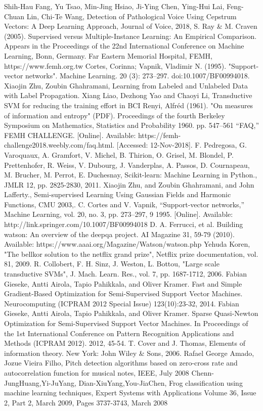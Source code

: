 \documentclass[conference]{IEEEtran}
\begin{document}
\begin{thebibliography}{00}
Shih-Hau Fang, Yu Tsao, Min-Jing Hsiao, Ji-Ying Chen, Ying-Hui Lai, Feng-Chuan Lin, Chi-Te Wang,
Detection of Pathological Voice Using Cepstrum Vectors: A Deep Learning Approach,
Journal of Voice, 2018,
S. Ray \& M. Craven (2005).
Supervised versus Multiple-Instance Learning: An Empirical Comparison.
Appears in the Proceedings of the 22nd International Conference on Machine Learning, Bonn, Germany.
Far Eastern Memorial Hospital, FEMH, https://www.femh.org.tw
Cortes, Corinna; Vapnik, Vladimir N. (1995). "Support-vector networks". Machine Learning. 20 (3): 273–297. doi:10.1007/BF00994018.
Xiaojin Zhu, Zoubin Ghahramani, Learning from Labeled and Unlabeled Data with Label Propagation. 
Xiang Liao, Dezhong Yao and Chaoyi Li, Transductive SVM for reducing the training effort in BCI
Renyi, Alfréd (1961). "On measures of information and entropy" (PDF). Proceedings of the fourth Berkeley Symposium on Mathematics, Statistics and Probability 1960. pp. 547–561
“FAQ,” FEMH CHALLENGE. [Online]. Available: https://femh-challenge2018.weebly.com/faq.html. [Accessed: 12-Nov-2018].
F. Pedregosa, G. Varoquaux, A. Gramfort, V. Michel, B. Thirion, O. Grisel, M. Blondel, P. Prettenhofer, R. Weiss, V. Dubourg, J. Vanderplas, A. Passos, D. Cournapeau, M. Brucher, M. Perrot, E. Duchesnay, Scikit-learn: Machine Learning in Python., JMLR 12, pp. 2825-2830, 2011.
Xiaojin Zhu, and Zoubin Ghahramani, and John Lafferty., Semi-supervised Learning Using Gaussian Fields and Harmonic Functions, CMU 2003,.
C. Cortes and V. Vapnik, “Support-vector networks,” Machine Learning, vol. 20, no. 3, pp. 273–297, 9 1995. [Online]. Available: http://link.springer.com/10.1007/BF00994018
D. A. Ferrucci, et al. Building watson: An overview of the deepqa project. AI Magazine 31, 59-79 (2010). Available: https://www.aaai.org/Magazine/Watson/watson.php
Yehuda Koren, "The bellkor solution to the netflix grand prize", Netflix prize documentation, vol. 81, 2009.
R. Collobert, F. H. Sinz, J. Weston, L. Bottou, "Large scale transductive SVMs", J. Mach. Learn. Res., vol. 7, pp. 1687-1712, 2006.
Fabian Gieseke, Antti Airola, Tapio Pahikkala, and Oliver Kramer. Fast and Simple Gradient-Based Optimization for Semi-Supervised Support Vector Machines. Neurocomputing (ICPRAM 2012 Special Issue) 123(10):23-32, 2014. 
Fabian Gieseke, Antti Airola, Tapio Pahikkala, and Oliver Kramer. Sparse Quasi-Newton Optimization for Semi-Supervised Support Vector Machines. In Proceedings of the 1st International Conference on Pattern Recognition Applications and Methods (ICPRAM 2012). 2012, 45-54. 
T. Cover and J. Thomas, Elements of information theory. New York: John Wiley \& Sons, 2006.
Rafael George Amado, Jozue Vieira Filho, Pitch detection algorithms based on zero-cross rate and autocorrelation function for musical notes, IEEE, July 2008
Chenn-JungHuang,Yi-JuYang, Dian-XiuYang,You-JiaChen, Frog classification using machine learning techniques, Expert Systems with Applications Volume 36, Issue 2, Part 2, March 2009, Pages 3737-3743, March 2008
\end{thebibliography}
\end{document}

